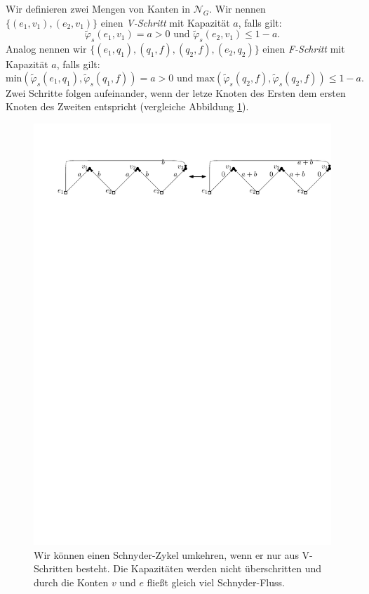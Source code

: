 \begin{definition}
Wir definieren zwei Mengen von Kanten in $\mathcal{N}_G$. Wir nennen $\{(e_1,v_1),(e_2,v_1)\}$ einen \textit{V-Schritt} mit Kapazität $a$, falls gilt: 
$$\tilde{\varphi}_s(e_1,v_1) = a > 0 \text{ und } \tilde{\varphi}_s(e_2,v_1) \leq 1 - a.$$ 
Analog nennen wir $\{(e_1,q_1),(q_1,f),(q_2,f),(e_2,q_2)\}$ einen \textit{F-Schritt} mit Kapazität $a$, falls gilt:
$$\text{min}(\tilde{\varphi}_s(e_1,q_1),\tilde{\varphi}_s(q_1,f)) = a > 0 \text{ und } \text{max}(\tilde{\varphi}_s(q_2,f),\tilde{\varphi}_s(q_2,f)) \leq 1 - a.$$
Zwei Schritte folgen aufeinander, wenn der letze Knoten des Ersten dem ersten Knoten des Zweiten entspricht (vergleiche Abbildung \ref{K_turn}).
\end{definition}

\begin{figure}[h]
\centering
\includegraphics[width=1\textwidth]{K_kreis.pdf}
\caption{Wir können einen Schnyder-Zykel umkehren, wenn er nur aus V-Schritten besteht. Die Kapazitäten werden nicht überschritten und durch die Konten $v$ und $e$ fließt gleich viel Schnyder-Fluss.}
\label{K_turn}
\end{figure}

